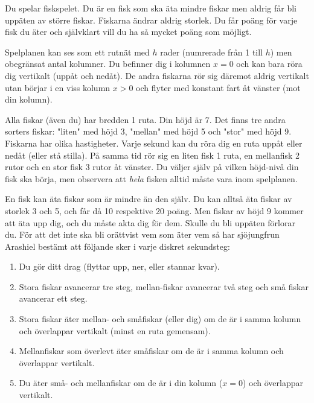 Du spelar fiskspelet. Du är en fisk som ska äta mindre fiskar men aldrig får
bli uppäten av större fiskar. Fiskarna ändrar aldrig storlek. Du får poäng för varje fisk du äter och självklart vill du ha så mycket
poäng som möjligt.

Spelplanen kan ses som ett rutnät med $h$ rader (numrerade från 1 till $h$) men obegränsat antal kolumner. Du befinner dig i kolumnen $x=0$ och kan bara röra dig vertikalt (uppåt och nedåt). De andra fiskarna rör sig däremot aldrig vertikalt utan börjar i en viss kolumn $x>0$ och flyter med konstant fart åt vänster (mot din kolumn). 

Alla fiskar (även du) har bredden 1 ruta. Din höjd är 7. Det finns tre andra sorters fiskar: "liten" med höjd 3, "mellan" med höjd 5 och "stor" med höjd 9. Fiskarna har olika hastigheter. Varje sekund kan du röra dig en ruta uppåt eller nedåt (eller stå stilla). På samma tid rör sig en liten fisk 1 ruta, en mellanfisk 2 rutor och en stor fisk 3 rutor åt vänster. Du väljer själv på vilken höjd-nivå din fisk ska börja, men observera att \emph{hela} fisken alltid måste vara inom spelplanen. 


En fisk kan äta fiskar som är mindre än den själv. Du kan alltså äta fiskar av storlek 3 och 5, och får då 10 respektive 20 poäng. Men fiskar av höjd 9 kommer att äta upp dig, och du måste akta dig för dem. Skulle du bli uppäten förlorar du. För att det inte ska bli orättvist vem som
äter vem så har sjöjungfrun Arashiel bestämt att följande sker i varje diskret
sekundsteg:

\begin{enumerate}
  \item
     Du gör ditt drag (flyttar upp, ner, eller stannar kvar).
  \item
     Stora fiskar avancerar tre steg, mellan-fiskar avancerar två steg och små fiskar avancerar ett steg.
  \item
     Stora fiskar äter mellan- och småfiskar (eller dig) om de är i samma kolumn och överlappar vertikalt (minst en ruta gemensam).
  \item
     Mellanfiskar som överlevt äter småfiskar om de är i samma kolumn och överlappar vertikalt.
  \item
     Du äter små- och mellanfiskar om de är i din kolumn ($x=0$) och överlappar vertikalt.
\end{enumerate}



